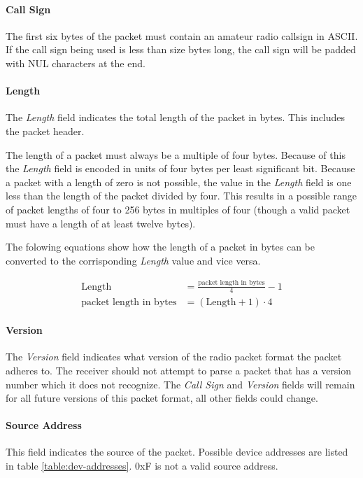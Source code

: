 \paragraph{Call Sign}
The first six bytes of the packet must contain an amateur radio callsign in
ASCII. If the call sign being used is less than size bytes long, the call sign
will be padded with NUL characters at the end.

\paragraph{Length}
The \emph{Length} field indicates the total length of the packet in bytes. This
includes the packet header.

The length of a packet must always be a multiple of four bytes. Because of this
the \emph{Length} field is encoded in units of four bytes per least significant
bit. Because a packet with a length of zero is not possible, the value in the 
\emph{Length} field is one less than the length of the packet divided by four.
This results in a possible range of packet lengths of four to 256 bytes in
multiples of four (though a valid packet must have a length of at least twelve
bytes).

The folowing equations show how the length of a packet in bytes can be converted
to the corrisponding \emph{Length} value and vice versa.

\begin{align*} 
\text{Length} &= \frac{\text{packet length in bytes}}{4} - 1 \\
\text{packet length in bytes} &= \left(\text{Length} + 1\right) \cdot 4
\end{align*}

\paragraph{Version}
The \emph{Version} field indicates what version of the radio packet format the
packet adheres to. The receiver should not attempt to parse a packet that has a
version number which it does not recognize. The \emph{Call Sign} and
\emph{Version} fields will remain for all future versions of this packet format,
all other fields could change.

\paragraph{Source Address}
This field indicates the source of the packet. Possible device addresses are
listed in table \ref{table:dev-addresses}. 0xF is not a valid source address.

